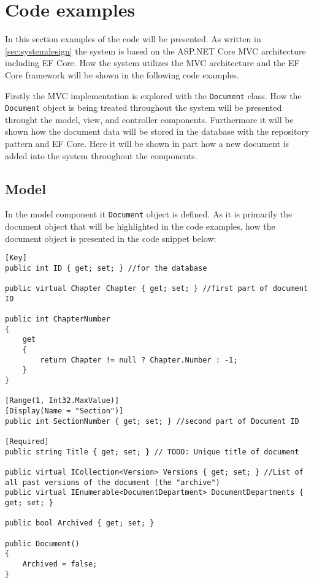 \section{Code examples}\label{sec:codeexamples}
In this section examples of the code will be presented.
As written in \cref{sec:systemdesign} the system is based on the ASP.NET Core MVC architecture including EF Core.
How the system utilizes the MVC architecture and the EF Core framework will be shown in the following code examples.

Firstly the MVC implementation is explored with the \texttt{Document} class.
How the \texttt{Document} object is being treated throughout the system will be presented throught the model, view, and controller components.
Furthermore it will be shown how the document data will be stored in the database with the repository pattern and EF Core.
Here it will be shown in part how a new document is added into the system throughout the components.

\subsection{Model}

In the model component it \texttt{Document} object is defined.
As it is primarily the document object that will be highlighted in the code examples, how the document object is presented in the code snippet below:
\\
\begin{lstlisting}[caption={Document Model: Document object}, label={lst:doc}]
[Key]
public int ID { get; set; } //for the database

public virtual Chapter Chapter { get; set; } //first part of document ID

public int ChapterNumber
{
	get
	{
		return Chapter != null ? Chapter.Number : -1;
	}
}

[Range(1, Int32.MaxValue)]
[Display(Name = "Section")]
public int SectionNumber { get; set; } //second part of Document ID

[Required]
public string Title { get; set; } // TODO: Unique title of document

public virtual ICollection<Version> Versions { get; set; } //List of all past versions of the document (the "archive")
public virtual IEnumerable<DocumentDepartment> DocumentDepartments { get; set; }

public bool Archived { get; set; }

public Document()
{
	Archived = false;
}
\end{lstlisting}

